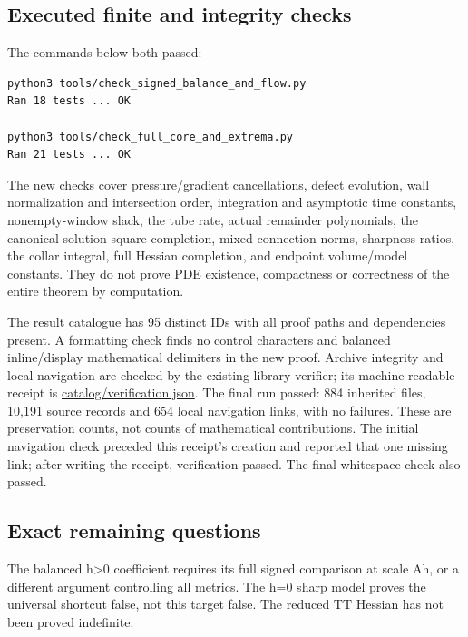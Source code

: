 \documentclass[
  10pt,
]{article}
\begin{document}
\hypertarget{executed-finite-and-integrity-checks}{%
\subsection{Executed finite and integrity
checks}\label{executed-finite-and-integrity-checks}}

The commands below both passed:

\begin{verbatim}
python3 tools/check_signed_balance_and_flow.py
Ran 18 tests ... OK

python3 tools/check_full_core_and_extrema.py
Ran 21 tests ... OK
\end{verbatim}

The new checks cover pressure/gradient cancellations, defect evolution,
wall normalization and intersection order, integration and asymptotic
time constants, nonempty-window slack, the tube rate, actual remainder
polynomials, the canonical solution square completion, mixed connection
norms, sharpness ratios, the collar integral, full Hessian completion,
and endpoint volume/model constants. They do not prove PDE existence,
compactness or correctness of the entire theorem by computation.

The result catalogue has 95 distinct IDs with all proof paths and
dependencies present. A formatting check finds no control characters and
balanced inline/display mathematical delimiters in the new proof.
Archive integrity and local navigation are checked by the existing
library verifier; its machine-readable receipt is
\href{../catalog/verification.json}{catalog/verification.json}. The
final run passed: 884 inherited files, 10,191 source records and 654
local navigation links, with no failures. These are preservation counts,
not counts of mathematical contributions. The initial navigation check
preceded this receipt's creation and reported that one missing link;
after writing the receipt, verification passed. The final whitespace
check also passed.

\hypertarget{exact-remaining-questions}{%
\subsection{Exact remaining questions}\label{exact-remaining-questions}}

The balanced h\textgreater0 coefficient requires its full signed
comparison at scale Ah, or a different argument controlling all metrics.
The h=0 sharp model proves the universal shortcut false, not this target
false. The reduced TT Hessian has not been proved indefinite.
\end{document}
